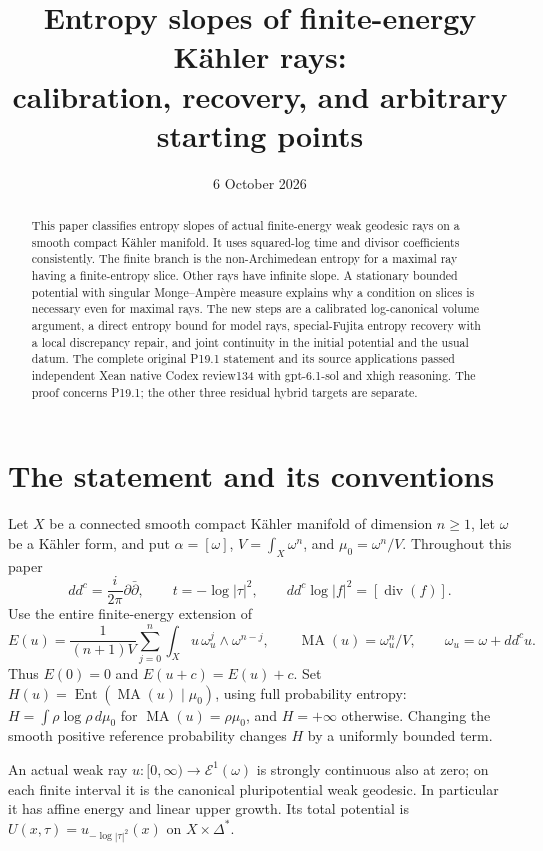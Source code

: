 \documentclass[11pt]{article}
\title{Entropy slopes of finite-energy K\"ahler rays:\\
calibration, recovery, and arbitrary starting points}
\author{}
\date{6 October 2026}
\newcommand{\MA}{\operatorname{MA}}
\newcommand{\Ent}{\operatorname{Ent}}
\begin{document}
\maketitle
\begin{abstract}
This paper classifies entropy slopes of actual finite-energy weak
geodesic rays on a smooth compact K\"ahler manifold. It uses squared-log
time and divisor coefficients consistently. The finite branch
is the non-Archimedean entropy for a maximal ray having a finite-entropy
slice. Other rays have infinite slope. A stationary bounded potential
with singular Monge--Amp\`ere measure explains why a condition on slices
is necessary even for maximal rays. The new steps are a calibrated
log-canonical volume argument, a direct entropy bound for model rays,
special-Fujita entropy recovery with a local discrepancy repair, and
joint continuity in the initial potential and the usual datum.
The complete original P19.1 statement and its source applications
passed independent Xean native Codex review134 with gpt-6.1-sol
and xhigh reasoning. The proof concerns P19.1; the other three
residual hybrid targets are separate.
\end{abstract}

\section{The statement and its conventions}
Let $X$ be a connected smooth compact K\"ahler manifold of dimension
$n\geq1$, let $\omega$ be a K\"ahler form, and put
$\alpha=[\omega]$, $V=\int_X\omega^n$, and $\mu_0=\omega^n/V$.
Throughout this paper
\[
 dd^c=\frac{i}{2\pi}\partial\bar\partial,
 \qquad t=-\log|\tau|^2,
 \qquad dd^c\log|f|^2=[\operatorname{div}(f)].                 \tag{1}
\]
Use the entire finite-energy extension of
\[
 E(u)=\frac1{(n+1)V}\sum_{j=0}^n
          \int_Xu\,\omega_u^j\wedge\omega^{n-j},\qquad
 \MA(u)=\omega_u^n/V,\qquad \omega_u=\omega+dd^cu.
\]
Thus $E(0)=0$ and $E(u+c)=E(u)+c$. Set
$H(u)=\Ent(\MA(u)\mid\mu_0)$, using full probability entropy:
$H=\int\rho\log\rho\,d\mu_0$ for $\MA(u)=\rho\mu_0$,
and $H=+\infty$ otherwise. Changing the smooth positive reference
probability changes $H$ by a uniformly bounded term.

An actual weak ray $u:[0,\infty)\to\mathcal E^1(\omega)$ is strongly
continuous also at zero; on each finite interval it is the canonical
pluripotential weak geodesic. In particular it has affine energy and
linear upper growth. Its total potential is
$U(x,\tau)=u_{-\log|\tau|^2}(x)$ on $X\times\Delta^*$.
\end{document}
